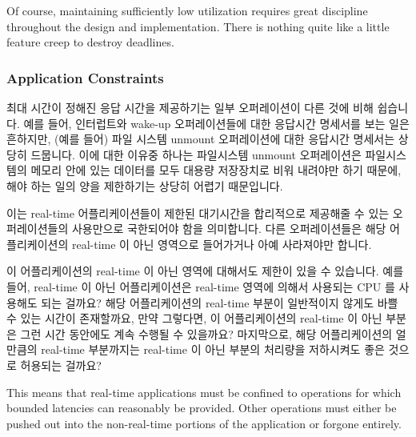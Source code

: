 Of course, maintaining sufficiently low utilization requires great
discipline throughout the design and implementation.
There is nothing quite like a little feature creep to destroy deadlines.
\fi

\subsubsection{Application Constraints}
\label{sec:rt:Application Constraints}

최대 시간이 정해진 응답 시간을 제공하기는 일부 오퍼레이션이 다른 것에 비해
쉽습니다.
예를 들어, 인터럽트와 wake-up 오퍼레이션들에 대한 응답시간 명세서를 보는 일은
흔하지만, (예를 들어) 파일 시스템 unmount 오퍼레이션에 대한 응답시간 명세서는
상당히 드뭅니다.
이에 대한 이유중 하나는 파일시스템 unmount 오퍼레이션은 파일시스템의 메모리
안에 있는 데이터를 모두 대용량 저장장치로 비워 내려야만 하기 때문에, 해야 하는
일의 양을 제한하기는 상당히 어렵기 때문입니다.

이는 real-time 어플리케이션들이 제한된 대기시간을 합리적으로 제공해줄 수 있는
오퍼레이션들의 사용만으로 국한되어야 함을 의미합니다.
다른 오퍼레이션들은 해당 어플리케이션의 real-time 이 아닌 영역으로 들어가거나
아예 사라져야만 합니다.

이 어플리케이션의 real-time 이 아닌 영역에 대해서도 제한이 있을 수 있습니다.
예를 들어, real-time 이 아닌 어플리케이션은 real-time 영역에 의해서 사용되는
CPU 를 사용해도 되는 걸까요?
해당 어플리케이션의 real-time 부분이 일반적이지 않게도 바쁠 수 있는 시간이
존재할까요, 만약 그렇다면, 이 어플리케이션의 real-time 이 아닌 부분은 그런 시간
동안에도 계속 수행될 수 있을까요?
마지막으로, 해당 어플리케이션의 얼만큼의 real-time 부분까지는 real-time 이 아닌
부분의 처리량을 저하시켜도 좋은 것으로 허용되는 걸까요?
\iffalse

This means that real-time applications must be confined to operations
for which bounded latencies can reasonably be provided.
Other operations must either be pushed out into the non-real-time portions
of the application or forgone entirely.

